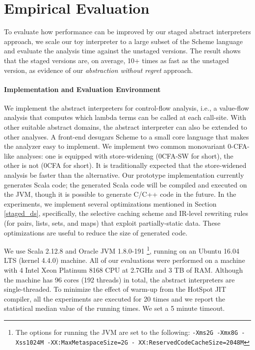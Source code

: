 \section{Empirical Evaluation} \label{evaluation}

To evaluate how performance can be improved by our staged abstract interpreters
approach, we scale our toy interpreter to a large subset of the Scheme language
and evaluate the analysis time against the unstaged versions. The result
shows that the staged versions are, on average, 10+ times as fast as the unstaged
version, as evidence of our \textit{abstraction without regret} approach.

\paragraph{Implementation and Evaluation Environment} We implement the abstract
interpreters for control-flow analysis, i.e., a value-flow analysis that
computes which lambda terms can be called at each call-site.
With other suitable abstract domains, the abstract interpreter
can also be extended to other analyses.
A front-end desugars Scheme to a small core language that makes the analyzer
easy to implement. We implement two common monovariant 0-CFA-like analyses: one
is equipped with store-widening (0CFA-SW for short), the other is not (0CFA
for short). It is traditionally expected that the store-widened analysis be faster than the
alternative.  Our prototype implementation currently generates Scala code; the
generated Scala code will be compiled and executed on the JVM, though it is possible to
generate C/C++ code in the future. In the experiments, we implement several
optimizations mentioned in Section \ref{staged_ds}, specifically, the selective
caching scheme and IR-level rewriting rules (for pairs, lists, sets, and maps)
that exploit partially-static data. These optimizations are useful to reduce
the size of generated code.

We use Scala 2.12.8 and Oracle JVM 1.8.0-191 \footnote{The options for
running the JVM are set to the following: \texttt{-Xms2G -Xmx8G -Xss1024M
-XX:MaxMetaspaceSize=2G - XX:ReservedCodeCacheSize=2048M}},
running on an Ubuntu 16.04 LTS (kernel 4.4.0) machine. All of our
evaluations were performed on a machine with 4 Intel Xeon Platinum
8168 CPU at 2.7GHz and 3 TB of RAM. Although the machine has 96 cores
(192 threads) in total, the abstract interpreters are single-threaded.
To minimize the effect of warm-up from the HotSpot JIT compiler,
all the experiments are executed for 20 times and we report the
statistical median value of the running times. We set a 5 minute
timeout.

